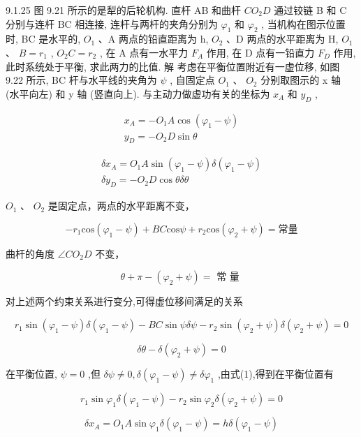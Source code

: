\begin{problem}{9.1.25}
图 9.21 所示的是犁的后轮机构. 直杆 AB 和曲杆 $CO_{2}D$ 通过铰链 B 和 C 分别与连杆 BC 相连接, 连杆与两杆的夹角分别为 $\varphi_{1}$ 和 $\varphi_{2}$ , 当机构在图示位置时, BC 是水平的, $O_{1}$ 、A 两点的铅直距离为 h, $O_{2}$ 、D 两点的水平距离为 H, $O_{1}$ 、 $B = r_{1}$ , $O_{2}C = r_{2}$ , 在 A 点有一水平力 $F_{A}$ 作用, 在 D 点有一铅直力 $F_{D}$ 作用, 此时系统处于平衡, 求此两力的比值. 解 考虑在平衡位置附近有一虚位移, 如图 9.22 所示, BC 杆与水平线的夹角为 $\psi$ , 自固定点 $O_{1}$ 、 $O_{2}$ 分别取图示的 x 轴 (水平向左) 和 y 轴 (竖直向上). 与主动力做虚功有关的坐标为 $x_{A}$ 和 $y_{D}$ ,

\[
\begin{array}{l} x _ {A} = - O _ {1} A \cos (\varphi_ {1} - \psi) \\ y _ {D} = - O _ {2} D \sin \theta \end{array}
\]

\[
\begin{array}{l} \delta x _ {A} = O _ {1} A \sin (\varphi_ {1} - \psi) \delta (\varphi_ {1} - \psi) \\ \delta y _ {D} = - O _ {2} D \cos \theta \delta \theta \end{array}
\]

$O_{1}$ 、 $O_{2}$ 是固定点，两点的水平距离不变，

\[
- r _ {1} \mathrm{cos} (\varphi_ {1} - \psi) + B C \mathrm{cos} \psi + r _ {2} \mathrm{cos} (\varphi_ {2} + \psi) = \text {常量}
\]

曲杆的角度 $\angle CO_2D$ 不变，

\[
\theta + \pi - (\varphi_ {2} + \psi) = \text { 常   量 }
\]

对上述两个约束关系进行变分,可得虚位移间满足的关系

\[
r _ {1} \sin (\varphi_ {1} - \psi) \delta (\varphi_ {1} - \psi) - B C \sin \psi \delta \psi - r _ {2} \sin (\varphi_ {2} + \psi) \delta (\varphi_ {2} + \psi) = 0\tag{1}
\]

\[
\delta \theta - \delta (\varphi_ {2} + \psi) = 0\tag{2}
\]

在平衡位置, $\psi=0$ ,但 $\delta\psi\neq0,\delta(\varphi_{1}-\psi)\neq\delta\varphi_{1}$ ,由式(1),得到在平衡位置有

\[
r _ {1} \sin \varphi_ {1} \delta (\varphi_ {1} - \psi) - r _ {2} \sin \varphi_ {2} \delta (\varphi_ {2} + \psi) = 0\tag{3}
\]

\[
\delta x _ {A} = O _ {1} A \sin \varphi_ {1} \delta (\varphi_ {1} - \psi) = h \delta (\varphi_ {1} - \psi)
\]


\end{problem}
